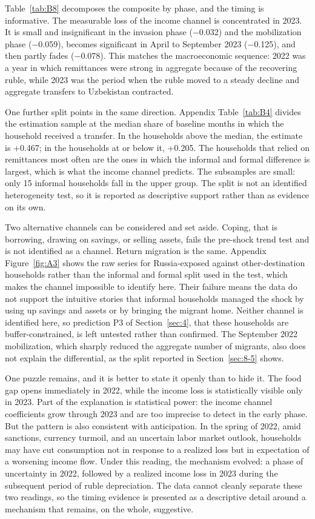 Table~\ref{tab:B8} decomposes the composite by phase, and the timing is informative. The measurable loss of the income channel is concentrated in 2023. It is small and insignificant in the invasion phase ($-$0.032) and the mobilization phase ($-$0.059), becomes significant in April to September 2023 ($-$0.125), and then partly fades ($-$0.078). This matches the macroeconomic sequence: 2022 was a year in which remittances were strong in aggregate because of the recovering ruble, while 2023 was the period when the ruble moved to a steady decline and aggregate transfers to Uzbekistan contracted.

One further split points in the same direction. Appendix Table~\ref{tab:B4} divides the estimation sample at the median share of baseline months in which the household received a transfer. In the households above the median, the estimate is +0.467; in the households at or below it, +0.205. The households that relied on remittances most often are the ones in which the informal and formal difference is largest, which is what the income channel predicts. The subsamples are small: only 15 informal households fall in the upper group. The split is not an identified heterogeneity test, so it is reported as descriptive support rather than as evidence on its own.

Two alternative channels can be considered and set aside. Coping, that is borrowing, drawing on savings, or selling assets, fails the pre-shock trend test and is not identified as a channel. Return migration is the same. Appendix Figure~\ref{fig:A3} shows the raw series for Russia-exposed against other-destination households rather than the informal and formal split used in the test, which makes the channel impossible to identify here. Their failure means the data do not support the intuitive stories that informal households managed the shock by using up savings and assets or by bringing the migrant home. Neither channel is identified here, so prediction P3 of Section~\ref{sec:4}, that these households are buffer-constrained, is left untested rather than confirmed. The September 2022 mobilization, which sharply reduced the aggregate number of migrants, also does not explain the differential, as the split reported in Section~\ref{sec:8-5} shows.

One puzzle remains, and it is better to state it openly than to hide it. The food gap opens immediately in 2022, while the income loss is statistically visible only in 2023. Part of the explanation is statistical power: the income channel coefficients grow through 2023 and are too imprecise to detect in the early phase. But the pattern is also consistent with anticipation. In the spring of 2022, amid sanctions, currency turmoil, and an uncertain labor market outlook, households may have cut consumption not in response to a realized loss but in expectation of a worsening income flow. Under this reading, the mechanism evolved: a phase of uncertainty in 2022, followed by a realized income loss in 2023 during the subsequent period of ruble depreciation. The data cannot cleanly separate these two readings, so the timing evidence is presented as a descriptive detail around a mechanism that remains, on the whole, suggestive.

